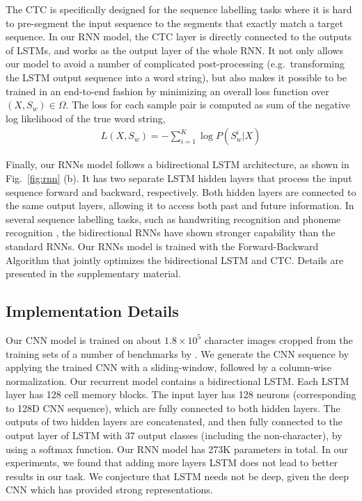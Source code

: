 \documentclass[letterpaper]{article}
\begin{document}
The CTC is specifically designed for the sequence labelling tasks where it is hard to  pre-segment the input sequence to the segments that exactly match a target sequence. In our RNN model, the CTC layer is directly connected to the outputs of LSTMs, and works as the output layer of the whole RNN. It not only allows our model to avoid a number of complicated post-processing (e.g.\ transforming the LSTM output sequence into a word string), but also makes it possible to be trained in an end-to-end fashion by minimizing an overall loss function over $(X,S_w)\in\Omega$. The loss for each sample pair is computed as sum of the negative log likelihood of the true word string,
\begin{eqnarray}
L(X,S_w)=-\sum_{i=1}^K \log P(S_w^i|X)
\end{eqnarray}

Finally, our RNNs model follows a bidirectional LSTM architecture, as shown in Fig.~\ref{fig:rnn} (b). It has two separate LSTM hidden layers that process the input sequence forward and backward, respectively. Both hidden layers are connected to the same output layers, allowing it to access both past and future information. In several sequence labelling tasks, such as handwriting recognition \cite{Graves2009} and phoneme recognition \cite{Graves2005}, the bidirectional RNNs have shown stronger capability than the standard RNNs. Our RNNs model is trained with the Forward-Backward Algorithm that jointly optimizes the bidirectional LSTM and CTC. Details are presented in the supplementary material.

\subsection{Implementation Details}
Our CNN model is trained on about $1.8 \times 10^5$ character images cropped from the training sets of a number of benchmarks by \cite{Jaderberg2014}. We generate the CNN sequence by applying the trained CNN with a sliding-window, followed by a column-wise normalization.
Our recurrent model contains a bidirectional LSTM. Each LSTM layer has 128  cell memory blocks. The input layer has 128 neurons (corresponding to 128D CNN sequence),  which are fully connected to both hidden layers. The outputs of two hidden layers are concatenated, and then fully connected to the output layer of LSTM with 37 output classes (including the non-character), by using a softmax function.
Our RNN model has 273K parameters in total. In our experiments, we found that adding more layers LSTM does not lead to better results in our task. We conjecture that LSTM needs not be deep, given the deep CNN which has provided strong representations.
\end{document}
